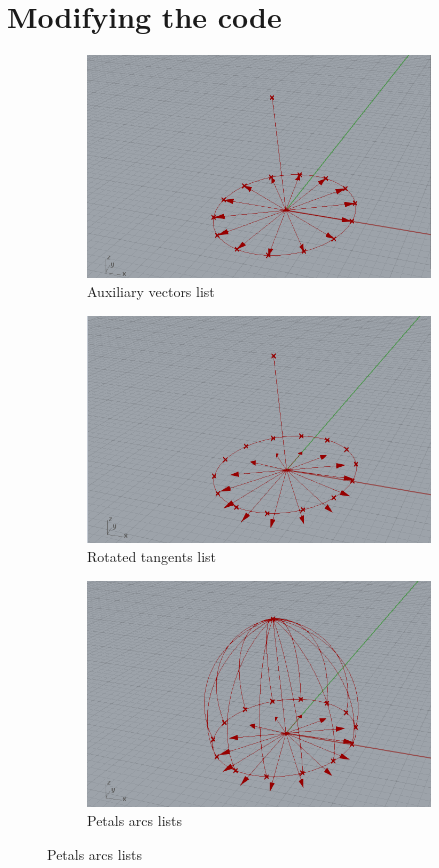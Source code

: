 \documentclass[preprint,12pt,3p]{elsarticle}
\begin{document}
\section{Modifying the code}
\label{extrap}

\begin{figure}[h]
\begin{subfigure}{0.3\textwidth}
  \centering
  \includegraphics[width=.9\linewidth]{ag03s01.png}
  \caption{Auxiliary vectors list}
  \label{fig:ag03s01}
\end{subfigure}%
\begin{subfigure}{0.3\textwidth}
  \centering
  \includegraphics[width=.9\linewidth]{ag03s02.png}
  \caption{Rotated tangents list}
  \label{fig:ag03s02}
\end{subfigure}
\begin{subfigure}{0.3\textwidth}
  \centering
  \includegraphics[width=.9\linewidth]{ag03s03.png}
  \caption{Petals arcs lists}
  \label{fig:ag03s03}
\end{subfigure}


\end{figure}
\end{document}
